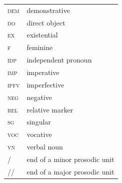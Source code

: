 \documentclass[output=paper,colorlinks,citecolor=brown]{langscibook}
\begin{document}
\begin{tabularx}{.45\textwidth}{ll}
\scshape dem  &  demonstrative \\
\scshape do   & direct object \\
\scshape ex &   existential \\
\scshape f   & feminine \\
\scshape idp  &  independent pronoun \\
\scshape imp  &  imperative \\
\scshape ipfv &   imperfective \\
\scshape neg   & negative \\
\scshape rel &   relative marker \\
\scshape sg &   singular \\
\scshape voc  &  vocative \\
\scshape vn &   verbal noun \\
/  &  end of a minor prosodic unit \\
// &   end of a major prosodic unit \\
\end{tabularx}

\newpage
\sloppy\printbibliography[heading=subbibliography,notkeyword=this]
\end{document}
